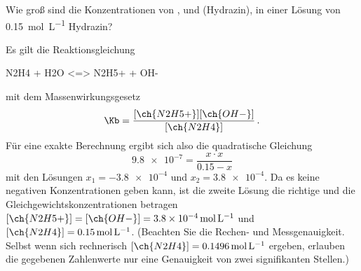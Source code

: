 \documentclass{scrartcl}
\begin{document}
\begin{question}
  Wie groß sind die Konzentrationen von ,  und 
  (Hydrazin), in einer Lösung von \SI{.15}{\mole\per\liter} Hydrazin?
\end{question}
\begin{solution}
  Es gilt die Reaktionsgleichung
  \begin{reaction*}
    N2H4 + H2O <=> N2H5+ + OH-
  \end{reaction*}
  mit dem Massenwirkungsgesetz
  \[
    \Kb = \frac{ [\ch{N2H5+}][\ch{OH-}] }{ [\ch{N2H4}] } \,.
  \]
  Für eine exakte Berechnung ergibt sich also die quadratische Gleichung
  \[
    \num{9.8e-7} = \frac{x\cdot x}{0.15 - x}
  \]
  mit den Lösungen $x_1 = \num{-3.8e-4}$ und $x_2 = \num{3.8e-4}$.  Da es
  keine negativen Konzentrationen geben kann, ist die zweite Lösung die
  richtige und die Gleichgewichtskonzentrationen betragen $[\ch{N2H5+}] =
  [\ch{OH-}] = \SI{3.8e-4}{\mole\per\liter}$ und $[\ch{N2H4}] =
  \SI{0.15}{\mole\per\liter}$.  (Beachten Sie die Rechen- und
  Messgenauigkeit.  Selbst wenn sich rechnerisch $[\ch{N2H4}] =
  \SI{0.1496}{\mole\per\liter}$ ergeben, erlauben die gegebenen Zahlenwerte
  nur eine Genauigkeit von zwei signifikanten Stellen.)
\end{solution}
\end{document}
